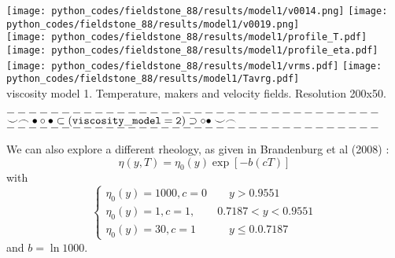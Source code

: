 \begin{center}
\texttt{[image: python\_codes/fieldstone\_88/results/model1/v0014.png]}
\texttt{[image: python\_codes/fieldstone\_88/results/model1/v0019.png]}\\
\texttt{[image: python\_codes/fieldstone\_88/results/model1/profile\_T.pdf]}
\texttt{[image: python\_codes/fieldstone\_88/results/model1/profile\_eta.pdf]}
\texttt{[image: python\_codes/fieldstone\_88/results/model1/vrms.pdf]}
\texttt{[image: python\_codes/fieldstone\_88/results/model1/Tavrg.pdf]}\\
{\captionfont viscosity model 1. Temperature, makers and velocity fields. Resolution 200x50.}
\end{center}


\newpage
\begin{center}
$----------------------------------$\\
$\smile \frown \bullet \circ \bullet \subset ( {\tt viscosity\_model=2} ) \supset \circ \bullet \smile \frown$\\
$----------------------------------$
\end{center}

We can also explore a different rheology, as given in Brandenburg et al (2008) \cite{brhv08}:
\[
\eta(y,T) = \eta_0(y) \exp [-b(cT)]
\]
with 
\[
\left\{
\begin{array}{c}
\eta_0(y)=1000, c=0 \qquad y> 0.9551 \\
\eta_0(y)=1,    c=1, \qquad  0.7187  <y< 0.9551 \\
\eta_0(y)=30,   c=1  \qquad\quad y \le 0.0.7187
\end{array}
\right.
\]
and $b=\ln 1000$.

